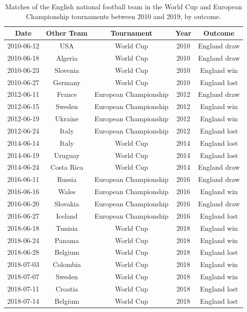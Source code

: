 \documentclass[12pt, a4paper]{article}
\begin{document}
 
 
\begin{table}[!htbp]
\centering
    \caption{Matches of the English national football team in the World Cup and European Championship tournaments between 2010 and 2019, by outcome.}
\begin{tabular}{ccccc}
  \hline
\textbf{Date} & \textbf{Other Team} & \textbf{Tournament} & \textbf{Year} & \textbf{Outcome} \\ 
  \hline
2010-06-12 & USA & World Cup & 2010 & England draw \\ 
  2010-06-18 & Algeria & World Cup & 2010 & England draw \\ 
  2010-06-23 & Slovenia & World Cup & 2010 & England win \\ 
  2010-06-27 & Germany & World Cup & 2010 & England lost \\ 
  2012-06-11 & France & European Championship & 2012 & England draw \\ 
  2012-06-15 & Sweden & European Championship & 2012 & England win \\ 
  2012-06-19 & Ukraine & European Championship & 2012 & England win \\ 
  2012-06-24 & Italy & European Championship & 2012 & England lost \\ 
  2014-06-14 & Italy & World Cup & 2014 & England lost \\ 
  2014-06-19 & Uruguay & World Cup & 2014 & England lost \\ 
  2014-06-24 & Costa Rica & World Cup & 2014 & England draw \\ 
  2016-06-11 & Russia & European Championship & 2016 & England draw \\ 
  2016-06-16 & Wales & European Championship & 2016 & England win \\ 
  2016-06-20 & Slovakia & European Championship & 2016 & England draw \\ 
  2016-06-27 & Iceland & European Championship & 2016 & England lost \\ 
  2018-06-18 & Tunisia & World Cup & 2018 & England win \\ 
  2018-06-24 & Panama & World Cup & 2018 & England win \\ 
  2018-06-28 & Belgium & World Cup & 2018 & England lost \\ 
  2018-07-03 & Colombia & World Cup & 2018 & England win \\ 
  2018-07-07 & Sweden & World Cup & 2018 & England win \\ 
  2018-07-11 & Croatia & World Cup & 2018 & England lost \\ 
  2018-07-14 & Belgium & World Cup & 2018 & England lost \\ 
   \hline
\end{tabular}
  \label{Tab:matches}
\end{table}
\end{document}
